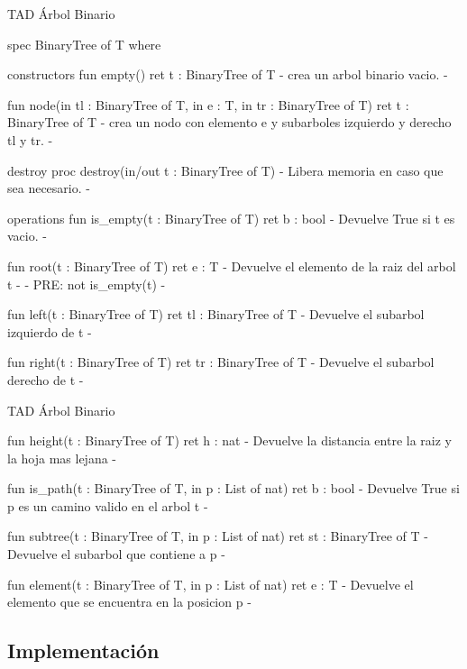 \begin{codebox}{TAD Árbol Binario}
\begin{pascallike}
spec BinaryTree of T where

constructors
    fun empty() ret t : BinaryTree of T
    {- crea un arbol binario vacio. -}

    fun node(in tl : BinaryTree of T, in e : T, in tr : BinaryTree of T) 
    ret t : BinaryTree of T
    {- crea un nodo con elemento e y subarboles izquierdo y derecho tl y tr. -}

destroy
    proc destroy(in/out t : BinaryTree of T)
    {- Libera memoria en caso que sea necesario. -}

operations
    fun is_empty(t : BinaryTree of T) ret b : bool
    {- Devuelve True si t es vacio. -}

    fun root(t : BinaryTree of T) ret e : T
    {- Devuelve el elemento de la raiz del arbol t -}
    {- PRE: not is_empty(t) -}

    fun left(t : BinaryTree of T) ret tl : BinaryTree of T
    {- Devuelve el subarbol izquierdo de t -}

    fun right(t : BinaryTree of T) ret tr : BinaryTree of T
    {- Devuelve el subarbol derecho de t -}
\end{pascallike}
\end{codebox}
\begin{codebox}{TAD Árbol Binario}
\begin{pascallike}
    fun height(t : BinaryTree of T) ret h : nat
    {- Devuelve la distancia entre la raiz y la hoja mas lejana -}

    fun is_path(t : BinaryTree of T, in p : List of nat) ret b : bool
    {- Devuelve True si p es un camino valido en el arbol t -}

    fun subtree(t : BinaryTree of T, in p : List of nat) ret st : BinaryTree of T
    {- Devuelve el subarbol que contiene a p -}

    fun element(t : BinaryTree of T, in p : List of nat) ret e : T
    {- Devuelve el elemento que se encuentra en la posicion p -}
\end{pascallike}
\end{codebox}

\subsection{Implementación}

